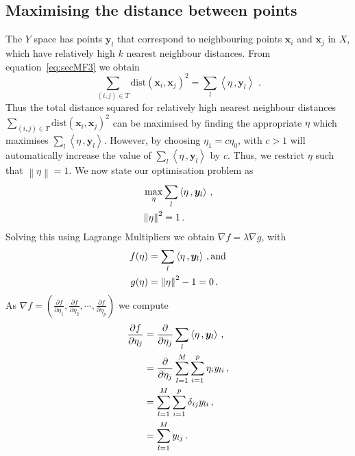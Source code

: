 \documentclass[11pt]{article}
\newcommand{\dist}{\text{dist}}
\begin{document}
\subsection{Maximising the distance between points}\label{sec:MathFrame2}
The $Y$ space has points $\bm{y}_l$ that correspond to neighbouring points $\bm{x}_i$ and $\bm{x}_j$ in $X$, which have relatively high $k$ nearest neighbour distances. From equation~\eqref{eq:secMF3} we obtain
\begin{equation} \label{eq:secMF4}
    \sum_{(i,j) \in T}\dist(\bm{x}_i, \bm{x}_j)^2 = \sum_{l}\left\langle \eta\, ,  \bm{y}_{l} \right\rangle\, \, .
\end{equation}
Thus  the total distance squared for relatively high nearest neighbour distances $ \sum_{(i,j) \in T}\dist(\bm{x}_i, \bm{x}_j)^2$  can be maximised by finding the appropriate $\eta$ which maximises $\sum_{l}\left\langle \eta\, ,  \bm{y}_{l} \right\rangle$. However, by choosing $\eta_1 = c \eta_0 $, with $c >1$ will automatically increase the value of $\sum_{l}\left\langle \eta\, ,  \bm{y}_{l} \right\rangle$ by $c$. Thus, we restrict $\eta$ such that $\left \lVert \eta \right\rVert = 1$.  We now state our optimisation problem as
\begin{align} \label{eq:secMF5}
     \max_\eta & \sum_{l}\left\langle \eta\, ,  \bm{y}_{l} \right\rangle \, , \\ 
    \left \lVert \eta \right\rVert^2  & = 1 \notag \, .
\end{align}
Solving this using Lagrange Multipliers we obtain $\nabla f  = \lambda \nabla g$, with 
\begin{align}\label{eq:secMF6}
    f(\eta) & = \sum_{l}\left\langle \eta\, ,  \bm{y}_{l} \right\rangle  \, , \text{and} \\
    g(\eta)  & = \left \lVert \eta \right\rVert^2  - 1 = 0 \, . \notag
\end{align}
As $\nabla f = \left( \frac{\partial f}{\partial \eta_1},  \frac{\partial f}{\partial \eta_2},  \cdots, \frac{\partial f}{\partial \eta_p} \right)$ we compute
\begin{align}\label{eq:secMF7}
\frac{\partial f}{\partial \eta_j} & =  \frac{\partial }{\partial \eta_j}\sum_{l}\left\langle \eta\, ,  \bm{y}_{l} \right\rangle \, ,  \notag  \\
& = \frac{\partial }{\partial \eta_j} \sum_{l=1}^M \sum_{i=1}^p \eta_i y_{li} \, ,\notag \\
& = \sum_{l=1}^M \sum_{i=1}^p  \delta_{ij} y_{li} \, , \notag \\
& = \sum_{l=1}^M y_{lj} \, . 
\end{align}
\end{document}
